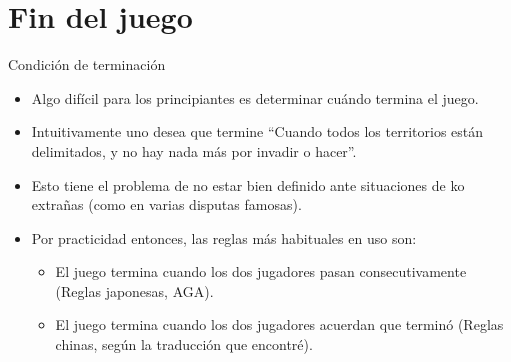 \documentclass{beamer}
\begin{document}
\section{Fin del juego}

\begin{frame}{Condición de terminación}

    \begin{itemize}
        \item Algo difícil para los principiantes es determinar cuándo termina el juego.
        \item Intuitivamente uno desea que termine ``Cuando todos los territorios están delimitados, y no hay nada más por invadir o hacer''.
        \item Esto tiene el problema de no estar bien definido ante situaciones de ko extrañas (como en varias disputas famosas).
        \item Por practicidad entonces, las reglas más habituales en uso son:
          \begin{itemize}
              \item El juego termina cuando los dos jugadores pasan consecutivamente (Reglas japonesas, AGA). 
              \item El juego termina cuando los dos jugadores acuerdan que terminó (Reglas chinas, según la traducción que encontré). 
          \end{itemize}
    \end{itemize}
  
\end{frame}
\end{document}
